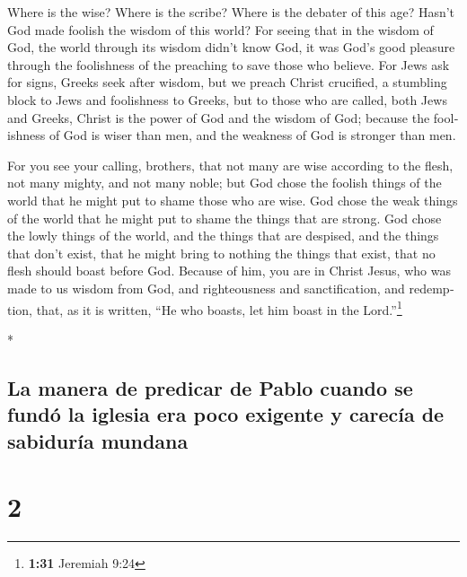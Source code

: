 \begin{paracol}{2}
\begin{otherlanguage}{english}
 Where is the wise? Where is the scribe? Where is the
debater of this age? Hasn't God made foolish the wisdom of this world?
 For seeing that in the wisdom of God, the world through
its wisdom didn't know God, it was God's good pleasure through the
foolishness of the preaching to save those who believe. 
For Jews ask for signs, Greeks seek after wisdom,  but we
preach Christ crucified, a stumbling block to Jews and foolishness to
Greeks,  but to those who are called, both Jews and
Greeks, Christ is the power of God and the wisdom of God;
 because the foolishness of God is wiser than men, and
the weakness of God is stronger than men.

 For you see your calling, brothers, that not many are
wise according to the flesh, not many mighty, and not many noble;
 but God chose the foolish things of the world that he
might put to shame those who are wise. God chose the weak things of the
world that he might put to shame the things that are strong.
 God chose the lowly things of the world, and the things
that are despised, and the things that don't exist, that he might bring
to nothing the things that exist,  that no flesh should
boast before God.  Because of him, you are in Christ
Jesus, who was made to us wisdom from God, and righteousness and
sanctification, and redemption,  that, as it is written,
``He who boasts, let him boast in the Lord.''\footnote{\textbf{1:31}
  Jeremiah 9:24}

\end{otherlanguage}

\switchcolumn[0]*

\hypertarget{la-manera-de-predicar-de-pablo-cuando-se-funduxf3-la-iglesia-era-poco-exigente-y-carecuxeda-de-sabiduruxeda-mundana}{%
\subsection{La manera de predicar de Pablo cuando se fundó la iglesia
era poco exigente y carecía de sabiduría
mundana}\label{la-manera-de-predicar-de-pablo-cuando-se-funduxf3-la-iglesia-era-poco-exigente-y-carecuxeda-de-sabiduruxeda-mundana}}

\hypertarget{section-2}{%
\section{2}\label{section-2}}


\end{paracol}
